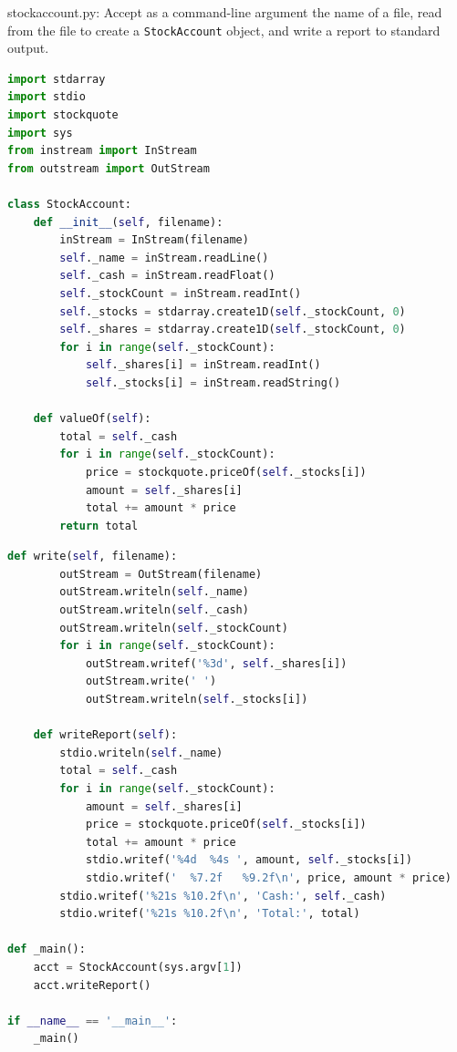 \documentclass[8pt,a4paper,compress]{beamer}
\begin{document}
\begin{frame}[fragile]
\pause

\begin{framed}
\tiny stockaccount.py: Accept as a command-line argument the name of a file, read from the file to create a \lstinline{StockAccount} object, and write a report to standard output.
\end{framed}

\begin{lstlisting}[language=python,style=focusin]
import stdarray
import stdio
import stockquote
import sys
from instream import InStream
from outstream import OutStream

class StockAccount:
    def __init__(self, filename):
        inStream = InStream(filename)
        self._name = inStream.readLine()
        self._cash = inStream.readFloat()
        self._stockCount = inStream.readInt()
        self._stocks = stdarray.create1D(self._stockCount, 0)
        self._shares = stdarray.create1D(self._stockCount, 0)
        for i in range(self._stockCount):
            self._shares[i] = inStream.readInt()
            self._stocks[i] = inStream.readString()

    def valueOf(self):
        total = self._cash
        for i in range(self._stockCount):
            price = stockquote.priceOf(self._stocks[i])
            amount = self._shares[i]
            total += amount * price
        return total
\end{lstlisting}
\end{frame}

\begin{frame}[fragile]
\pause

\begin{lstlisting}[language=python,style=focusin]
    def write(self, filename):
        outStream = OutStream(filename)
        outStream.writeln(self._name)
        outStream.writeln(self._cash)
        outStream.writeln(self._stockCount)
        for i in range(self._stockCount):
            outStream.writef('%3d', self._shares[i])
            outStream.write(' ')
            outStream.writeln(self._stocks[i])

    def writeReport(self):
        stdio.writeln(self._name)
        total = self._cash
        for i in range(self._stockCount):
            amount = self._shares[i]
            price = stockquote.priceOf(self._stocks[i])
            total += amount * price
            stdio.writef('%4d  %4s ', amount, self._stocks[i])
            stdio.writef('  %7.2f   %9.2f\n', price, amount * price)
        stdio.writef('%21s %10.2f\n', 'Cash:', self._cash)
        stdio.writef('%21s %10.2f\n', 'Total:', total)

def _main():
    acct = StockAccount(sys.argv[1])
    acct.writeReport()

if __name__ == '__main__':
    _main()
\end{lstlisting}
\end{frame}
\end{document}
